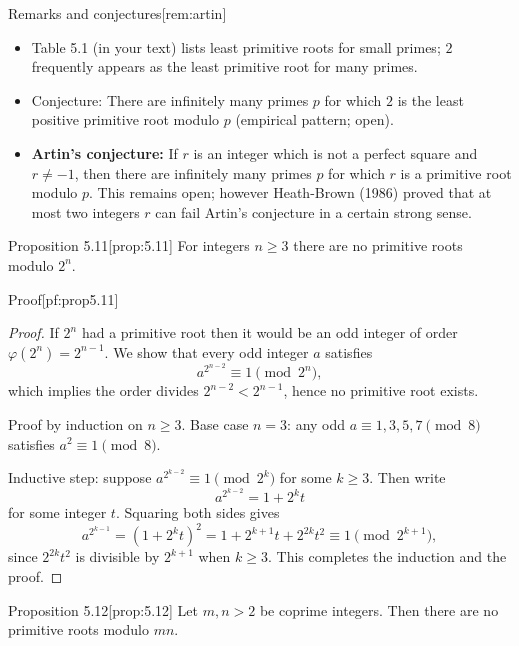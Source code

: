 \documentclass[10pt]{article}
\theoremstyle{definition}
\theoremstyle{plain}
\numberwithin{equation}{section}
\begin{document}
\begin{define}{Remarks and conjectures}[rem:artin]
\begin{itemize}
  \item Table 5.1 (in your text) lists least primitive roots for small primes; $2$ frequently appears as the least primitive root for many primes.
  \item Conjecture: There are infinitely many primes $p$ for which $2$ is the least positive primitive root modulo $p$ (empirical pattern; open).
  \item \textbf{Artin's conjecture:} If $r$ is an integer which is not a perfect square and $r\ne -1$, then there are infinitely many primes $p$ for which $r$ is a primitive root modulo $p$. This remains open; however Heath-Brown (1986) proved that at most two integers $r$ can fail Artin's conjecture in a certain strong sense.
\end{itemize}
\end{define}

\bigskip

\begin{define}{Proposition 5.11}[prop:5.11]
For integers $n\ge 3$ there are no primitive roots modulo $2^n$.
\end{define}

\begin{define}{Proof}[pf:prop5.11]
\begin{proof}
If $2^n$ had a primitive root then it would be an odd integer of order $\varphi(2^n)=2^{n-1}$. We show that every odd integer $a$ satisfies
\[
a^{2^{n-2}}\equiv 1\pmod{2^n},
\]
which implies the order divides $2^{n-2}<2^{n-1}$, hence no primitive root exists.

Proof by induction on $n\ge3$. Base case $n=3$: any odd $a\equiv 1,3,5,7\pmod 8$ satisfies $a^2\equiv1\pmod8$.

Inductive step: suppose $a^{2^{k-2}}\equiv 1\pmod{2^k}$ for some $k\ge3$. Then write
\[
a^{2^{k-2}}=1+2^k t
\]
for some integer $t$. Squaring both sides gives
\[
a^{2^{k-1}}=(1+2^k t)^2 = 1 + 2^{k+1}t + 2^{2k}t^2 \equiv 1 \pmod{2^{k+1}},
\]
since $2^{2k}t^2$ is divisible by $2^{k+1}$ when $k\ge3$. This completes the induction and the proof.
\end{proof}
\end{define}

\begin{define}{Proposition 5.12}[prop:5.12]
Let $m,n>2$ be coprime integers. Then there are no primitive roots modulo $mn$.
\end{define}
\end{document}
